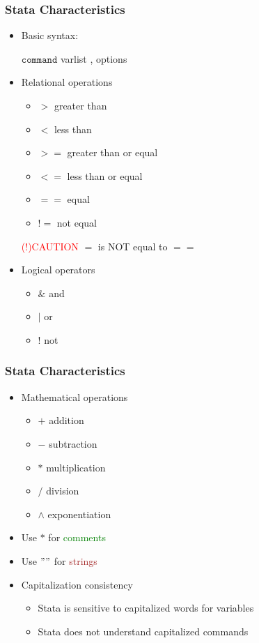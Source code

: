 \documentclass[11pt, xcolor=x11names,compress]{beamer}
\begin{document}
\begin{frame}[fragile,t]
\frametitle{Stata Characteristics}
\begin{itemize}
    \item Basic syntax:
    \begin{center}
        $\texttt{command}$ varlist , options
    \end{center}
    \item Relational operations
    \begin{itemize}
        \item $>$ greater than
        \item $<$ less than
        \item $>=$ greater than or equal
        \item $<=$ less than or equal
        \item $==$ equal
        \item $!=$ not equal
    \end{itemize}
    \textcolor{red}{(!)CAUTION} $=$ is NOT equal to $==$
    \item Logical operators 
    \begin{itemize}
        \item $\&$ and
        \item $|$ or
        \item $!$ not
    \end{itemize}

\end{itemize}
\end{frame}

\begin{frame}[fragile,t]
\frametitle{Stata Characteristics}
\begin{itemize}
    \item Mathematical operations
    \begin{itemize}
        \item $+$ addition
        \item $-$ subtraction
        \item $*$ multiplication
        \item $/$ division
        \item $\wedge$ exponentiation
    \end{itemize}
    \item Use $*$ for \textcolor{green}{comments}
    \item Use $""$ for \textcolor{brown}{strings}
    \item Capitalization consistency
    \begin{itemize}
        \item Stata is sensitive to capitalized words for variables
        \item Stata does not understand capitalized commands 
    \end{itemize}
\end{itemize}
\end{frame}
\end{document}
